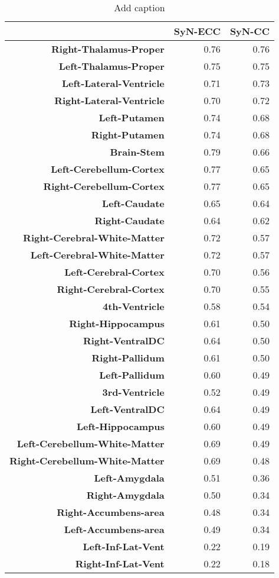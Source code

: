 \begin{table}[htbp]
  \centering
  \caption{Add caption}
    \begin{tabular}{|r|r|r|}
    \toprule
          & \textbf{SyN-ECC} & \textbf{SyN-CC} \\
    \midrule
    \textbf{Right-Thalamus-Proper} & 0.76  & 0.76 \\
    \textbf{Left-Thalamus-Proper} & 0.75  & 0.75 \\
    \textbf{Left-Lateral-Ventricle} & 0.71  & 0.73 \\
    \textbf{Right-Lateral-Ventricle} & 0.70  & 0.72 \\
    \textbf{Left-Putamen} & 0.74  & 0.68 \\
    \textbf{Right-Putamen} & 0.74  & 0.68 \\
    \textbf{Brain-Stem} & 0.79  & 0.66 \\
    \textbf{Left-Cerebellum-Cortex} & 0.77  & 0.65 \\
    \textbf{Right-Cerebellum-Cortex} & 0.77  & 0.65 \\
    \textbf{Left-Caudate} & 0.65  & 0.64 \\
    \textbf{Right-Caudate} & 0.64  & 0.62 \\
    \textbf{Right-Cerebral-White-Matter} & 0.72  & 0.57 \\
    \textbf{Left-Cerebral-White-Matter} & 0.72  & 0.57 \\
    \textbf{Left-Cerebral-Cortex} & 0.70  & 0.56 \\
    \textbf{Right-Cerebral-Cortex} & 0.70  & 0.55 \\
    \textbf{4th-Ventricle} & 0.58  & 0.54 \\
    \textbf{Right-Hippocampus} & 0.61  & 0.50 \\
    \textbf{Right-VentralDC} & 0.64  & 0.50 \\
    \textbf{Right-Pallidum} & 0.61  & 0.50 \\
    \textbf{Left-Pallidum} & 0.60  & 0.49 \\
    \textbf{3rd-Ventricle} & 0.52  & 0.49 \\
    \textbf{Left-VentralDC} & 0.64  & 0.49 \\
    \textbf{Left-Hippocampus} & 0.60  & 0.49 \\
    \textbf{Left-Cerebellum-White-Matter} & 0.69  & 0.49 \\
    \textbf{Right-Cerebellum-White-Matter} & 0.69  & 0.48 \\
    \textbf{Left-Amygdala} & 0.51  & 0.36 \\
    \textbf{Right-Amygdala} & 0.50  & 0.34 \\
    \textbf{Right-Accumbens-area} & 0.48  & 0.34 \\
    \textbf{Left-Accumbens-area} & 0.49  & 0.34 \\
    \textbf{Left-Inf-Lat-Vent} & 0.22  & 0.19 \\
    \textbf{Right-Inf-Lat-Vent} & 0.22  & 0.18 \\
    \bottomrule
    \end{tabular}%
  \label{tabaddlabel}%
\end{table}%
